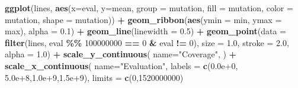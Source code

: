 \documentclass[
]{book}
\newenvironment{Shaded}{\begin{snugshade}}{\end{snugshade}}
\newcommand{\AttributeTok}[1]{\textcolor[rgb]{0.13,0.29,0.53}{#1}}
\newcommand{\DecValTok}[1]{\textcolor[rgb]{0.00,0.00,0.81}{#1}}
\newcommand{\FloatTok}[1]{\textcolor[rgb]{0.00,0.00,0.81}{#1}}
\newcommand{\FunctionTok}[1]{\textcolor[rgb]{0.13,0.29,0.53}{\textbf{#1}}}
\newcommand{\NormalTok}[1]{#1}
\newcommand{\SpecialCharTok}[1]{\textcolor[rgb]{0.81,0.36,0.00}{\textbf{#1}}}
\newcommand{\StringTok}[1]{\textcolor[rgb]{0.31,0.60,0.02}{#1}}
\begin{document}
\begin{Shaded}
\begin{Highlighting}[]
\FunctionTok{ggplot}\NormalTok{(lines, }\FunctionTok{aes}\NormalTok{(}\AttributeTok{x=}\NormalTok{eval, }\AttributeTok{y=}\NormalTok{mean, }\AttributeTok{group =}\NormalTok{ mutation, }\AttributeTok{fill =}\NormalTok{ mutation, }\AttributeTok{color =}\NormalTok{ mutation, }\AttributeTok{shape =}\NormalTok{ mutation)) }\SpecialCharTok{+}
  \FunctionTok{geom\_ribbon}\NormalTok{(}\FunctionTok{aes}\NormalTok{(}\AttributeTok{ymin =}\NormalTok{ min, }\AttributeTok{ymax =}\NormalTok{ max), }\AttributeTok{alpha =} \FloatTok{0.1}\NormalTok{) }\SpecialCharTok{+}
  \FunctionTok{geom\_line}\NormalTok{(}\AttributeTok{linewidth =} \FloatTok{0.5}\NormalTok{) }\SpecialCharTok{+}
  \FunctionTok{geom\_point}\NormalTok{(}\AttributeTok{data =} \FunctionTok{filter}\NormalTok{(lines, eval }\SpecialCharTok{\%\%} \DecValTok{100000000} \SpecialCharTok{==} \DecValTok{0} \SpecialCharTok{\&}\NormalTok{ eval }\SpecialCharTok{!=} \DecValTok{0}\NormalTok{), }\AttributeTok{size =} \FloatTok{1.0}\NormalTok{, }\AttributeTok{stroke =} \FloatTok{2.0}\NormalTok{, }\AttributeTok{alpha =} \FloatTok{1.0}\NormalTok{) }\SpecialCharTok{+}
  \FunctionTok{scale\_y\_continuous}\NormalTok{(}
    \AttributeTok{name=}\StringTok{"Coverage"}\NormalTok{,}
\NormalTok{  ) }\SpecialCharTok{+}
  \FunctionTok{scale\_x\_continuous}\NormalTok{(}
    \AttributeTok{name=}\StringTok{"Evaluation"}\NormalTok{,}
    \AttributeTok{labels =} \FunctionTok{c}\NormalTok{(}\StringTok{\textquotesingle{}0.0e+0\textquotesingle{}}\NormalTok{, }\StringTok{\textquotesingle{}5.0e+8\textquotesingle{}}\NormalTok{,}\StringTok{\textquotesingle{}1.0e+9\textquotesingle{}}\NormalTok{,}\StringTok{\textquotesingle{}1.5e+9\textquotesingle{}}\NormalTok{),}
    \AttributeTok{limits =} \FunctionTok{c}\NormalTok{(}\DecValTok{0}\NormalTok{,}\DecValTok{1520000000}\NormalTok{)}


\end{Highlighting}
\end{Shaded}
\end{document}
